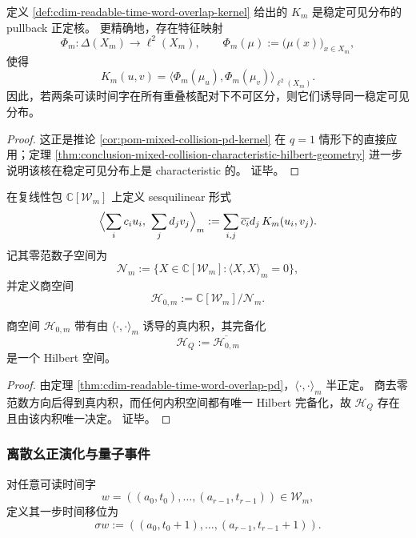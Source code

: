 \begin{theorem}[稳定可见分布上的正定重叠核]\label{thm:cdim-readable-time-word-overlap-pd}
定义 \ref{def:cdim-readable-time-word-overlap-kernel} 给出的 \(K_m\) 是稳定可见分布的 pullback 正定核。
更精确地，存在特征映射
\[
\Phi_m:\Delta(X_m)\longrightarrow \ell^2(X_m),
\qquad
\Phi_m(\mu):=\bigl(\mu(x)\bigr)_{x\in X_m},
\]
使得
\[
K_m(u,v)=\langle \Phi_m(\mu_u),\Phi_m(\mu_v)\rangle_{\ell^2(X_m)}.
\]
因此，若两条可读时间字在所有重叠核配对下不可区分，则它们诱导同一稳定可见分布。
\end{theorem}
\begin{proof}
这正是推论 \ref{cor:pom-mixed-collision-pd-kernel} 在 \(q=1\) 情形下的直接应用；定理 \ref{thm:conclusion-mixed-collision-characteristic-hilbert-geometry} 进一步说明该核在稳定可见分布上是 characteristic 的。
证毕。
\end{proof}

\begin{definition}\label{def:cdim-hilbert-precarrier}
在复线性包 \(\mathbb C[\mathcal W_m]\) 上定义 sesquilinear 形式
\[
\Bigl\langle \sum_i c_i u_i,\ \sum_j d_j v_j\Bigr\rangle_m
:=
\sum_{i,j}\overline{c_i}d_j\,K_m(u_i,v_j).
\]
记其零范数子空间为
\[
\mathcal N_m:=\{X\in\mathbb C[\mathcal W_m]:\langle X,X\rangle_m=0\},
\]
并定义商空间
\[
\mathcal H_{0,m}:=\mathbb C[\mathcal W_m]/\mathcal N_m.
\]
\end{definition}

\begin{theorem}[Hilbert 载体]\label{thm:cdim-hilbert-carrier}
商空间 \(\mathcal H_{0,m}\) 带有由 \(\langle\cdot,\cdot\rangle_m\) 诱导的真内积，其完备化
\[
\mathcal H_Q:=\overline{\mathcal H_{0,m}}
\]
是一个 Hilbert 空间。
\end{theorem}
\begin{proof}
由定理 \ref{thm:cdim-readable-time-word-overlap-pd}，\(\langle\cdot,\cdot\rangle_m\) 半正定。
商去零范数方向后得到真内积，而任何内积空间都有唯一 Hilbert 完备化，故 \(\mathcal H_Q\) 存在且由该内积唯一决定。
证毕。
\end{proof}

\subsubsection{离散幺正演化与量子事件}
\begin{definition}[一步时间移位]\label{def:cdim-one-step-time-shift}
对任意可读时间字
\[
w=((a_0,t_0),\dots,(a_{r-1},t_{r-1}))\in\mathcal W_m,
\]
定义其一步时间移位为
\[
\sigma w:=((a_0,t_0+1),\dots,(a_{r-1},t_{r-1}+1)).
\]
\end{definition}

